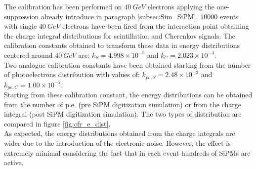 The calibration has been performed on $40\ GeV$ electrons applying the one-suppression already introduce in paragraph \ref{subsec:Sim_SiPM}. $10000$ events with single $40\ GeV$ electrons have been fired from the interaction point obtaining the charge integral distributions for scintillation and Cherenkov signals.%
The calibration constants obtained to transform these data in energy distributions centered around $40\ GeV$ are: $k_S = 4.998 \times 10^{-5}$ and $k_C = 2.023 \times 10^{-4}$.\\
Two analogue calibration constants have been obtained starting from the number of photoelectrons distribution with values of:  $k_{pe,S} = 2.48 \times 10^{-3}$ and $k_{pe,C} = 1.00 \times 10^{-2}$.\\


Starting from these calibration constant, the energy distributions can be obtained from the number of p.e. (pre SiPM digitization simulation) or from the charge integral (post SiPM digitization simulation). The two types of distribution are compared in figure \ref{fig:cfr_e_dist}.\\
As expected, the energy distributions obtained from the charge integrals are wider due to the introduction of the electronic noise. However, the effect is extremely minimal considering the fact that in each event hundreds of SiPMs are active.\\

